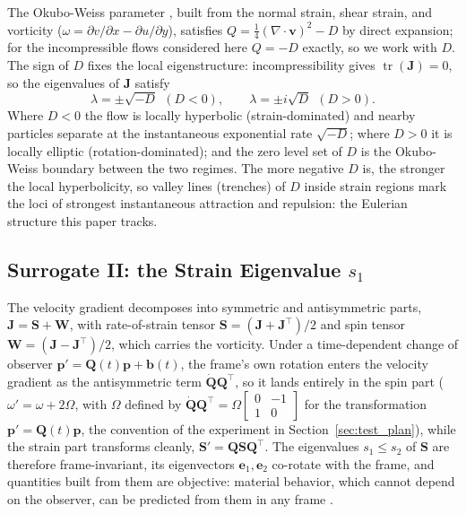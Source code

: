 \documentclass[lettersize,journal]{IEEEtran}
\begin{document}
The Okubo-Weiss parameter \cite{21,22}, built from the normal strain,
shear strain, and vorticity
($\omega = \partial v/\partial x - \partial u/\partial y$), satisfies
$Q = \tfrac{1}{4}(\nabla \cdot \mathbf{v})^2 - D$ by direct expansion;
for the incompressible flows considered here $Q = -D$ exactly, so we
work with $D$. The sign of $D$ fixes the local eigenstructure:
incompressibility gives $\operatorname{tr}(\mathbf{J}) = 0$, so the
eigenvalues of $\mathbf{J}$ satisfy
\begin{equation}
    \lambda = \pm\sqrt{-D} \ \ (D < 0), \qquad
    \lambda = \pm i\sqrt{D} \ \ (D > 0).
    \label{eq:eig_detj}
\end{equation}
Where $D < 0$ the flow is locally hyperbolic (strain-dominated) and
nearby particles separate at the instantaneous exponential rate
$\sqrt{-D}$; where $D > 0$ it is locally elliptic (rotation-dominated);
and the zero level set of $D$ is the Okubo-Weiss boundary between the
two regimes. The more negative $D$ is, the stronger the local
hyperbolicity, so valley lines (trenches) of $D$ inside strain regions
mark the loci of strongest instantaneous attraction and repulsion: the
Eulerian structure this paper tracks.

\subsection{Surrogate II: the Strain Eigenvalue $s_1$}
\label{sec:strain_field}

The velocity gradient decomposes into symmetric and antisymmetric
parts, $\mathbf{J} = \mathbf{S} + \mathbf{W}$, with rate-of-strain
tensor $\mathbf{S} = (\mathbf{J} + \mathbf{J}^\top)/2$ and spin tensor
$\mathbf{W} = (\mathbf{J} - \mathbf{J}^\top)/2$, which carries the
vorticity. Under a time-dependent change of observer $\mathbf{p}' =
\mathbf{Q}(t)\mathbf{p} + \mathbf{b}(t)$, the frame's own rotation
enters the velocity gradient as the antisymmetric term
$\dot{\mathbf{Q}}\mathbf{Q}^\top$, so it lands entirely in the spin
part ($\omega' = \omega + 2\Omega$, with $\Omega$ defined by
$\dot{\mathbf{Q}}\mathbf{Q}^\top = \Omega\left[\begin{smallmatrix} 0 &
-1 \\ 1 & 0 \end{smallmatrix}\right]$ for the transformation
$\mathbf{p}' = \mathbf{Q}(t)\mathbf{p}$, the convention of the
experiment in Section~\ref{sec:test_plan}), while the strain part
transforms cleanly, $\mathbf{S}' =
\mathbf{Q}\mathbf{S}\mathbf{Q}^\top$. The eigenvalues $s_1 \leq s_2$ of
$\mathbf{S}$ are therefore frame-invariant, its eigenvectors
$\mathbf{e}_1, \mathbf{e}_2$ co-rotate with the frame, and quantities
built from them are objective: material behavior, which cannot depend
on the observer, can be predicted from them in any frame \cite{16,17}.
\end{document}
